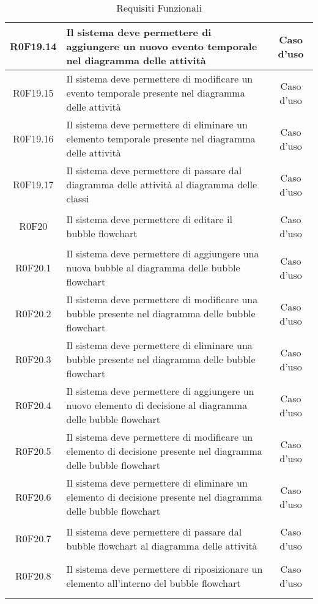 \documentclass[../AnalisiDeiRequisiti.tex]{subfiles}
\begin{document}
\begin{longtable}{|c|>{\centering}p{7cm}|c|}
	\hypertarget{R0F19.14}{R0F19.14} & Il sistema deve permettere di aggiungere un nuovo evento temporale nel diagramma delle attività & Caso d'uso \\ \hline
	\hypertarget{R0F19.15}{R0F19.15} & Il sistema deve permettere di modificare un evento temporale presente nel diagramma delle attività & Caso d'uso \\ \hline
	\hypertarget{R0F19.16}{R0F19.16} & Il sistema deve permettere di eliminare un elemento temporale presente nel diagramma delle attività & Caso d'uso \\ \hline
	\hypertarget{R0F19.17}{R0F19.17} & Il sistema deve permettere di passare dal diagramma delle attività al diagramma delle classi & Caso d'uso \\ \hline
	\hypertarget{R0F20}{R0F20} & Il sistema deve permettere di editare il bubble flowchart & Caso d'uso \\ \hline
	\hypertarget{R0F20.1}{R0F20.1} & Il sistema deve permettere di aggiungere una nuova bubble al diagramma delle bubble flowchart & Caso d'uso \\ \hline
	\hypertarget{R0F20.2}{R0F20.2} & Il sistema deve permettere di modificare una bubble presente nel diagramma delle bubble flowchart & Caso d'uso \\ \hline
	\hypertarget{R0F20.3}{R0F20.3} & Il sistema deve permettere di eliminare una bubble presente nel diagramma delle bubble flowchart & Caso d'uso \\ \hline
	\hypertarget{R0F20.4}{R0F20.4} & Il sistema deve permettere di aggiungere un nuovo elemento di decisione al diagramma delle bubble flowchart & Caso d'uso \\ \hline
	\hypertarget{R0F20.5}{R0F20.5} & Il sistema deve permettere di modificare un elemento di decisione presente nel diagramma delle bubble flowchart & Caso d'uso \\ \hline
	\hypertarget{R0F20.6}{R0F20.6} & Il sistema deve permettere di eliminare un elemento di decisione presente nel diagramma delle bubble flowchart & Caso d'uso \\ \hline
	\hypertarget{R0F20.7}{R0F20.7} & Il sistema deve permettere di passare dal bubble flowchart al diagramma delle attività & Caso d'uso \\ \hline
	\hypertarget{R0F20.8}{R0F20.8} & Il sistema deve permettere di riposizionare un elemento all'interno del bubble flowchart & Caso d'uso \\ \hline
	\caption[Requisiti Funzionali]{Requisiti Funzionali}
	\label{tabella:req0}
\end{longtable}
\clearpage
\end{document}
